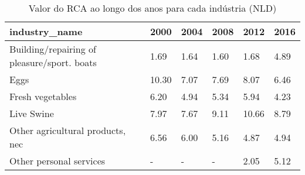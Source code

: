 \begin{table}
\centering
\caption{Valor do RCA ao longo dos anos para cada indústria (NLD)}
\begin{tabular}{p{6cm}p{1.5cm}p{1.5cm}p{1.5cm}p{1.5cm}p{1.5cm}}
\toprule
                              industry\_name &  2000 & 2004 & 2008 &  2012 & 2016 \\
\midrule
Building/repairing of pleasure/sport. boats &  1.69 & 1.64 & 1.60 &  1.68 & 4.89 \\
                                       Eggs & 10.30 & 7.07 & 7.69 &  8.07 & 6.46 \\
                           Fresh vegetables &  6.20 & 4.94 & 5.34 &  5.94 & 4.23 \\
                                 Live Swine &  7.97 & 7.67 & 9.11 & 10.66 & 8.79 \\
           Other agricultural products, nec &  6.56 & 6.00 & 5.16 &  4.87 & 4.94 \\
                    Other personal services &     - &    - &    - &  2.05 & 5.12 \\
\bottomrule
\end{tabular}
\end{table}
